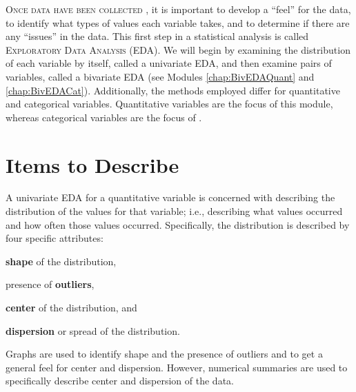 \documentclass[10pt,openany]{book}\usepackage[]{graphicx}\usepackage[]{color}
\begin{document}
\minitoc
\newpage

\lettrine{O}{nce data have been collected} , it is important to develop a ``feel'' for the data, to identify what types of values each variable takes, and to determine if there are any ``issues'' in the data.  This first step in a statistical analysis is called \textsc{Exploratory Data Analysis} (EDA).  We will begin by examining the distribution of each variable by itself, called a univariate EDA, and then examine pairs of variables, called a bivariate EDA (see Modules \ref{chap:BivEDAQuant} and \ref{chap:BivEDACat}). Additionally, the methods employed differ for quantitative and categorical variables. Quantitative variables are the focus of this module, whereas categorical variables are the focus of .

\vspace{-6pt}
\section{Items to Describe}
\vspace{-12pt}
A univariate EDA for a quantitative variable is concerned with describing the distribution of the values for that variable; i.e., describing what values occurred and how often those values occurred.  Specifically, the distribution is described by four specific attributes:

\vspace{-12pt}
\begin{Enumerate}
  \item \textbf{shape} of the distribution,
  \item presence of \textbf{outliers},
  \item \textbf{center} of the distribution, and
  \item \textbf{dispersion} or spread of the distribution.
\end{Enumerate}
\vspace{-8pt}

Graphs are used to identify shape and the presence of outliers and to get a general feel for center and dispersion.  However, numerical summaries are used to specifically describe center and dispersion of the data.

\vspace{-6pt}

\vspace{-12pt}
\end{document}
